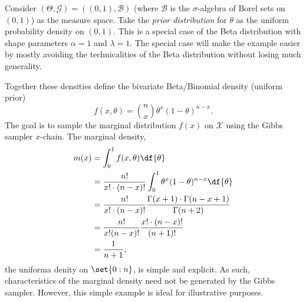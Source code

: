 \documentclass[12pt]{article}
\begin{document}
Consider \( (\Theta, \mathcal{G}) = ((0, 1), \mathcal{B}) \) (where \(
\mathcal{B} \) is the \( \sigma \)-algebra of Borel sets on \( (0, 1) \))
as the measure space.  Take the \emph{prior distribution} for \( \theta \)
as the uniform probability density on \( (0,1) \).  This is a special
case of the Beta distribution with shape parameters \( \alpha = 1 \) and
\( \lambda = 1 \).  The special case will make the example easier by
mostly avoiding the technicalities of the Beta distribution without
losing much generality.

Together these densities define the bivariate Beta/Binomial density%
(uniform prior)
\[
    f(x,\theta) = \binom{n}{x}\theta^x(1-\theta)^{n-x}.
\] The goal is to sample the marginal distribution \( f(x) \) on \(
\mathcal{X} \) using the Gibbs sampler \( x \)-chain.  The marginal
density,
\begin{align*}
    m(x) &= \int_0^1 f(x,\theta) \df{\theta} \\
    &= \frac{n!}{x!  \cdot (n-x)!} \int_0^1 \theta^x(1-\theta)^{n-x} \df
    {\theta} \\
    &= \frac{n!}{x!  \cdot (n-x)!} \frac{\Gamma(x+1) \cdot \Gamma(n-x+1)}
    {\Gamma(n+2)} \\
    &= \frac{n!}{x!  (n-x)!} \frac{x!  \cdot (n-x)!}{(n+1)!} \\
    &= \frac{1}{n+1},
\end{align*}
the uniforma denity on \( \set{0:n} \), is simple and explicit.  As
such, characteristics of the marginal density need not be generated by
the Gibbs sampler.  However, this simple example is ideal for
illustrative purposes.
\end{document}
